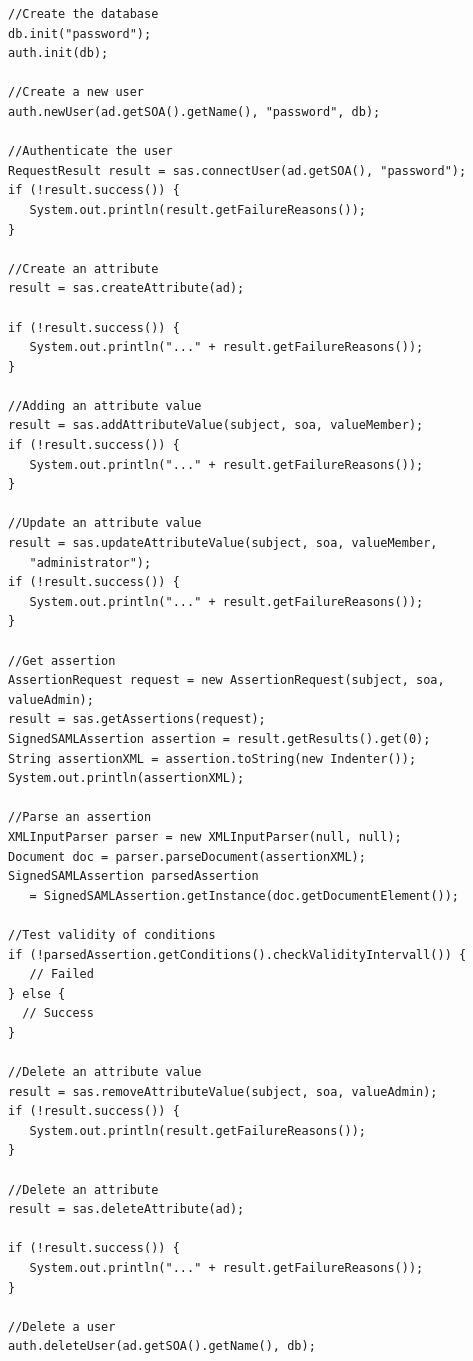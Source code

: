 \documentclass[10pt,a4paper]{article}
\begin{document}
\begin{verbatim}
//Create the database
db.init("password");
auth.init(db);

//Create a new user
auth.newUser(ad.getSOA().getName(), "password", db);

//Authenticate the user
RequestResult result = sas.connectUser(ad.getSOA(), "password");
if (!result.success()) {
   System.out.println(result.getFailureReasons());
}
		
//Create an attribute
result = sas.createAttribute(ad);
		
if (!result.success()) {
   System.out.println("..." + result.getFailureReasons());
}
		
//Adding an attribute value
result = sas.addAttributeValue(subject, soa, valueMember);
if (!result.success()) {
   System.out.println("..." + result.getFailureReasons());
}
		
//Update an attribute value
result = sas.updateAttributeValue(subject, soa, valueMember,
   "administrator");
if (!result.success()) {
   System.out.println("..." + result.getFailureReasons());
}

//Get assertion
AssertionRequest request = new AssertionRequest(subject, soa, valueAdmin);
result = sas.getAssertions(request);
SignedSAMLAssertion assertion = result.getResults().get(0);
String assertionXML = assertion.toString(new Indenter());
System.out.println(assertionXML);
		
//Parse an assertion
XMLInputParser parser = new XMLInputParser(null, null);
Document doc = parser.parseDocument(assertionXML);
SignedSAMLAssertion parsedAssertion 
   = SignedSAMLAssertion.getInstance(doc.getDocumentElement());
		
//Test validity of conditions
if (!parsedAssertion.getConditions().checkValidityIntervall()) {
   // Failed
} else {
  // Success
}

//Delete an attribute value
result = sas.removeAttributeValue(subject, soa, valueAdmin);
if (!result.success()) {
   System.out.println(result.getFailureReasons());
}		

//Delete an attribute
result = sas.deleteAttribute(ad);
		
if (!result.success()) {
   System.out.println("..." + result.getFailureReasons());
}

//Delete a user
auth.deleteUser(ad.getSOA().getName(), db);
\end{verbatim}


\end{document}
